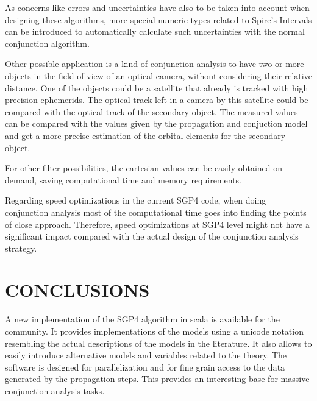 \documentclass{article}
\begin{document}
As concerns like errors and uncertainties have also to be taken into account when designing these
algorithms, more special numeric types related to Spire's Intervals can be introduced to automatically
calculate such uncertainties with the normal conjunction algorithm.

Other possible application is a kind of conjunction analysis to have two or more objects in the field of view of
an optical camera, without considering their relative distance. One of the objects could be a satellite that
already is tracked with high precision ephemerids. The optical track left in a camera by this satellite could
be compared with the optical track of the secondary object. The measured values
can be compared with the values given by the propagation and conjuction model and get
a more precise estimation of the orbital elements for the secondary object.

For other filter possibilities, the cartesian values can be easily obtained on demand, saving computational time and memory requirements.

Regarding speed optimizations in the current SGP4 code, when doing conjunction analysis most of the computational time goes into finding the points of close approach. Therefore, speed optimizations at SGP4 level might not have a significant impact compared with the actual design of the conjunction analysis strategy.


\section{CONCLUSIONS}
\label{sec:conclusions}

A new implementation of the SGP4 algorithm in scala is available for the community.
It provides implementations of the models using a unicode notation resembling the
actual descriptions of the models in the literature. It also allows to easily
introduce alternative models and variables related to the theory.
The software is designed for parallelization and for fine grain access to the data generated by
the propagation steps. This provides an
interesting base for massive conjunction analysis tasks.


\end{document}
